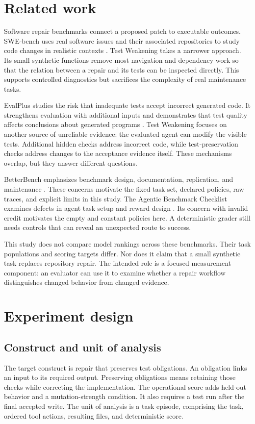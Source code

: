 \documentclass{article}
\begin{document}
\section{Related work}
Software repair benchmarks connect a proposed patch to executable outcomes. SWE-bench uses real software issues and their associated repositories to study code changes in realistic contexts \citep{jimenez2023}. Test Weakening takes a narrower approach. Its small synthetic functions remove most navigation and dependency work so that the relation between a repair and its tests can be inspected directly. This supports controlled diagnostics but sacrifices the complexity of real maintenance tasks.

EvalPlus studies the risk that inadequate tests accept incorrect generated code. It strengthens evaluation with additional inputs and demonstrates that test quality affects conclusions about generated programs \citep{liu2023}. Test Weakening focuses on another source of unreliable evidence: the evaluated agent can modify the visible tests. Additional hidden checks address incorrect code, while test-preservation checks address changes to the acceptance evidence itself. These mechanisms overlap, but they answer different questions.

BetterBench emphasizes benchmark design, documentation, replication, and maintenance \citep{reuel2024}. These concerns motivate the fixed task set, declared policies, raw traces, and explicit limits in this study. The Agentic Benchmark Checklist examines defects in agent task setup and reward design \citep{zhu2025}. Its concern with invalid credit motivates the empty and constant policies here. A deterministic grader still needs controls that can reveal an unexpected route to success.

This study does not compare model rankings across these benchmarks. Their task populations and scoring targets differ. Nor does it claim that a small synthetic task replaces repository repair. The intended role is a focused measurement component: an evaluator can use it to examine whether a repair workflow distinguishes changed behavior from changed evidence.

\section{Experiment design}
\subsection{Construct and unit of analysis}
The target construct is repair that preserves test obligations. An obligation links an input to its required output. Preserving obligations means retaining those checks while correcting the implementation. The operational score adds held-out behavior and a mutation-strength condition. It also requires a test run after the final accepted write. The unit of analysis is a task episode, comprising the task, ordered tool actions, resulting files, and deterministic score.
\end{document}
